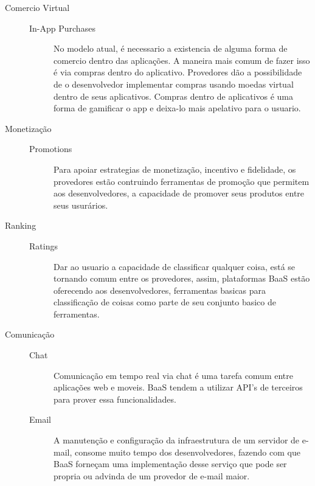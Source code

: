\begin{description}
		\item[Comercio Virtual]
			\begin{description}
            	\item[]
				\item[In-App Purchases] { No modelo atual, é necessario a existencia de alguma forma de comercio dentro das aplicações. A maneira mais comum de fazer isso é via compras dentro do aplicativo. Provedores dão a possibilidade de o desenvolvedor implementar compras usando moedas virtual dentro de seus aplicativos. Compras dentro de aplicativos é uma forma de gamificar o app e deixa-lo mais apelativo para o usuario.}
			\end{description}
		
		\item[Monetização]
			\begin{description}
            	\item[]
				\item[Promotions] { Para apoiar estrategias de monetização, incentivo e fidelidade, os provedores estão contruindo ferramentas de promoção que permitem aos desenvolvedores, a capacidade de promover seus produtos entre seus usurários.}
			\end{description}
		
		\item[Ranking]
			\begin{description}
            	\item[]
				\item[Ratings] { Dar ao usuario a capacidade de classificar qualquer coisa, está se tornando comum entre os provedores, assim, plataformas BaaS estão oferecendo aos desenvolvedores, ferramentas basicas para classificação de coisas como parte de seu conjunto basico de ferramentas.}
			\end{description}
		
		\item[Comunicação]
			\begin{description}
				\item[]
                \item[Chat] { Comunicação em tempo real via chat é uma tarefa comum entre aplicações web e moveis. BaaS tendem a utilizar API's de terceiros para prover essa funcionalidades.}

				\item[Email] { A manutenção e configuração da infraestrutura de um servidor de e-mail, consome muito tempo dos desenvolvedores, fazendo com que BaaS forneçam uma implementação desse serviço que pode ser propria ou advinda de um provedor de e-mail maior.}


\end{description}
\end{description}
